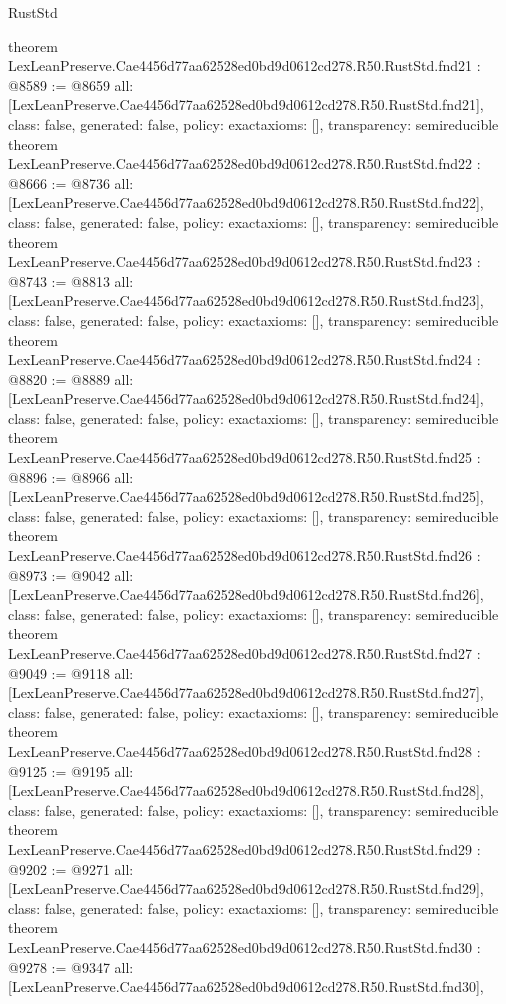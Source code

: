 \begin{lexlean}{RustStd}
\begin{coremodule}
{}
theorem LexLeanPreserve.Cae4456d77aa62528ed0bd9d0612cd278.R50.RustStd.fnd21 : @8589 := @8659 {
  all: [LexLeanPreserve.Cae4456d77aa62528ed0bd9d0612cd278.R50.RustStd.fnd21],
  class: false,
  generated: false,
  policy: exact{axioms: []},
  transparency: semireducible
}
theorem LexLeanPreserve.Cae4456d77aa62528ed0bd9d0612cd278.R50.RustStd.fnd22 : @8666 := @8736 {
  all: [LexLeanPreserve.Cae4456d77aa62528ed0bd9d0612cd278.R50.RustStd.fnd22],
  class: false,
  generated: false,
  policy: exact{axioms: []},
  transparency: semireducible
}
theorem LexLeanPreserve.Cae4456d77aa62528ed0bd9d0612cd278.R50.RustStd.fnd23 : @8743 := @8813 {
  all: [LexLeanPreserve.Cae4456d77aa62528ed0bd9d0612cd278.R50.RustStd.fnd23],
  class: false,
  generated: false,
  policy: exact{axioms: []},
  transparency: semireducible
}
theorem LexLeanPreserve.Cae4456d77aa62528ed0bd9d0612cd278.R50.RustStd.fnd24 : @8820 := @8889 {
  all: [LexLeanPreserve.Cae4456d77aa62528ed0bd9d0612cd278.R50.RustStd.fnd24],
  class: false,
  generated: false,
  policy: exact{axioms: []},
  transparency: semireducible
}
theorem LexLeanPreserve.Cae4456d77aa62528ed0bd9d0612cd278.R50.RustStd.fnd25 : @8896 := @8966 {
  all: [LexLeanPreserve.Cae4456d77aa62528ed0bd9d0612cd278.R50.RustStd.fnd25],
  class: false,
  generated: false,
  policy: exact{axioms: []},
  transparency: semireducible
}
theorem LexLeanPreserve.Cae4456d77aa62528ed0bd9d0612cd278.R50.RustStd.fnd26 : @8973 := @9042 {
  all: [LexLeanPreserve.Cae4456d77aa62528ed0bd9d0612cd278.R50.RustStd.fnd26],
  class: false,
  generated: false,
  policy: exact{axioms: []},
  transparency: semireducible
}
theorem LexLeanPreserve.Cae4456d77aa62528ed0bd9d0612cd278.R50.RustStd.fnd27 : @9049 := @9118 {
  all: [LexLeanPreserve.Cae4456d77aa62528ed0bd9d0612cd278.R50.RustStd.fnd27],
  class: false,
  generated: false,
  policy: exact{axioms: []},
  transparency: semireducible
}
theorem LexLeanPreserve.Cae4456d77aa62528ed0bd9d0612cd278.R50.RustStd.fnd28 : @9125 := @9195 {
  all: [LexLeanPreserve.Cae4456d77aa62528ed0bd9d0612cd278.R50.RustStd.fnd28],
  class: false,
  generated: false,
  policy: exact{axioms: []},
  transparency: semireducible
}
theorem LexLeanPreserve.Cae4456d77aa62528ed0bd9d0612cd278.R50.RustStd.fnd29 : @9202 := @9271 {
  all: [LexLeanPreserve.Cae4456d77aa62528ed0bd9d0612cd278.R50.RustStd.fnd29],
  class: false,
  generated: false,
  policy: exact{axioms: []},
  transparency: semireducible
}
theorem LexLeanPreserve.Cae4456d77aa62528ed0bd9d0612cd278.R50.RustStd.fnd30 : @9278 := @9347 {
  all: [LexLeanPreserve.Cae4456d77aa62528ed0bd9d0612cd278.R50.RustStd.fnd30],
}
\end{coremodule}
\end{lexlean}
